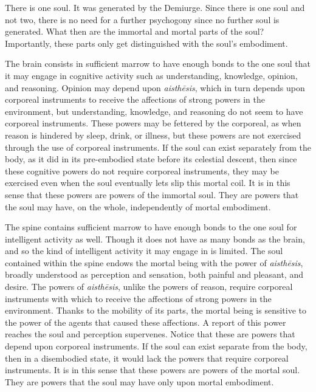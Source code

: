 There is one soul. It was generated by the Demiurge. Since there is one soul and not two, there is no need for a further psychogony since no further soul is generated. What then are the immortal and mortal parts of the soul? Importantly, these parts only get distinguished with the soul's embodiment. 

The brain consists in sufficient marrow to have enough bonds to the one soul that it may engage in cognitive activity such as understanding, knowledge, opinion, and reasoning. Opinion may depend upon \emph{aisthēsis}, which in turn depends upon corporeal instruments to receive the affections of strong powers in the environment, but understanding, knowledge, and reasoning do not seem to have corporeal instruments. These powers may be fettered by the corporeal, as when reason is hindered by sleep, drink, or illness, but these powers are not exercised through the use of corporeal instruments. If the soul can exist separately from the body, as it did in its pre-embodied state before its celestial descent, then since these cognitive powers do not require corporeal instruments, they may be exercised even when the soul eventually lets slip this mortal coil. It is in this sense that these powers are powers of the immortal soul. They are powers that the soul may have, on the whole, independently of mortal embodiment.

The spine contains sufficient marrow to have enough bonds to the one soul for intelligent activity as well. Though it does not have as many bonds as the brain, and so the kind of intelligent activity it may engage in is limited. The soul contained within the spine endows the mortal being with the power of \emph{aisthēsis}, broadly understood as perception and sensation, both painful and pleasant, and desire. The powers of \emph{aisthēsis}, unlike the powers of reason, require corporeal instruments with which to receive the affections of strong powers in the environment. Thanks to the mobility of its parts, the mortal being is sensitive to the power of the agents that caused these affections. A report of this power reaches the soul and perception supervenes. Notice that these are powers that depend upon corporeal instruments. If the soul can exist separate from the body, then in a disembodied state, it would lack the powers that require corporeal instruments. It is in this sense that these powers are powers of the mortal soul. They are powers that the soul may have only upon mortal embodiment.

